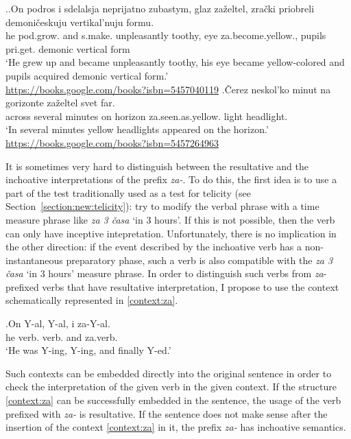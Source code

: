 \ex.\label{ex:zazeltet}\ag.\label{ex:zazeltet1}On podros i sdelalsja neprijatno zubastym, glaz za\v{z}eltel, zra\v{c}ki priobreli demoni\v{c}eskuju vertikal'nuju formu.\\
he pod.grow. and s.make. unpleasantly toothy, eye za.become.yellow., pupils pri.get. demonic vertical form\\
`He grew up and became unpleasantly toothy, his eye became yellow-colored and pupils acquired demonic vertical form.'\\\hbox{}\hfill\hbox{\url{https://books.google.com/books?isbn=5457040119}}
\bg.\label{ex:zazeltet2}\v{C}erez neskol'ko minut na gorizonte za\v{z}eltel svet far.\\
across several minutes on horizon za.seen.as.yellow. light headlight.\\
`In several minutes yellow headlights appeared on the horizon.'\\\hbox{}\hfill\hbox{\url{https://books.google.com/books?isbn=5457264963}}

It is sometimes very hard to distinguish between the resultative and the inchoative interpretations of the prefix \textit{za-}. To do this, the first idea is to use a part of the test traditionally used as a test for telicity (see Section~\ref{section:new:telicity}): try to modify the verbal phrase with a time measure phrase like \textit{za 3 \v{c}asa} `in 3 hours'. If this is not possible, then the verb can only have inceptive intepretation. Unfortunately, there is no implication in the other direction: if the event described by the inchoative verb has a non-instantaneous preparatory phase, such a verb is also compatible with the \textit{za 3 \v{c}asa} `in 3 hours' measure phrase. In order to distinguish such verbs from \textit{za}-prefixed verbs that have resultative interpretation, I propose to use the context schematically represented in \ref{context:za}.

\exg.\label{context:za}On Y-al, Y-al, i za-Y-al.\\
he verb. verb. and za.verb.\\
\trans `He was Y-ing, Y-ing, and finally Y-ed.'

Such contexts can be embedded directly into the original sentence in order to check the interpretation of the given verb in the given context. If the structure \ref{context:za} can be successfully embedded in the sentence, the usage of the verb prefixed with \textit{za-} is resultative. If the sentence does not make sense after the insertion of the context \ref{context:za} in it, the prefix \textit{za-} has inchoative semantics.

